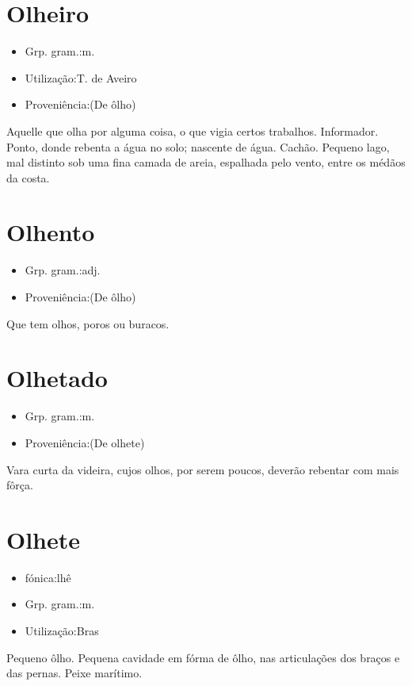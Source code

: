 \section{Olheiro}
\begin{itemize}
\item {Grp. gram.:m.}
\end{itemize}
\begin{itemize}
\item {Utilização:T. de Aveiro}
\end{itemize}
\begin{itemize}
\item {Proveniência:(De \textunderscore ôlho\textunderscore )}
\end{itemize}
Aquelle que olha por alguma coisa, o que vigia certos trabalhos.
Informador.
Ponto, donde rebenta a água no solo; nascente de água.
Cachão.
Pequeno lago, mal distinto sob uma fina camada de areia, espalhada pelo vento, entre os médãos da costa.
\section{Olhento}
\begin{itemize}
\item {Grp. gram.:adj.}
\end{itemize}
\begin{itemize}
\item {Proveniência:(De \textunderscore ôlho\textunderscore )}
\end{itemize}
Que tem olhos, poros ou buracos.
\section{Olhetado}
\begin{itemize}
\item {Grp. gram.:m.}
\end{itemize}
\begin{itemize}
\item {Proveniência:(De \textunderscore olhete\textunderscore )}
\end{itemize}
Vara curta da videira, cujos olhos, por serem poucos, deverão rebentar com mais fôrça.
\section{Olhete}
\begin{itemize}
\item {fónica:lhê}
\end{itemize}
\begin{itemize}
\item {Grp. gram.:m.}
\end{itemize}
\begin{itemize}
\item {Utilização:Bras}
\end{itemize}
Pequeno ôlho.
Pequena cavidade em fórma de ôlho, nas articulações dos braços e das pernas.
Peixe marítimo.
